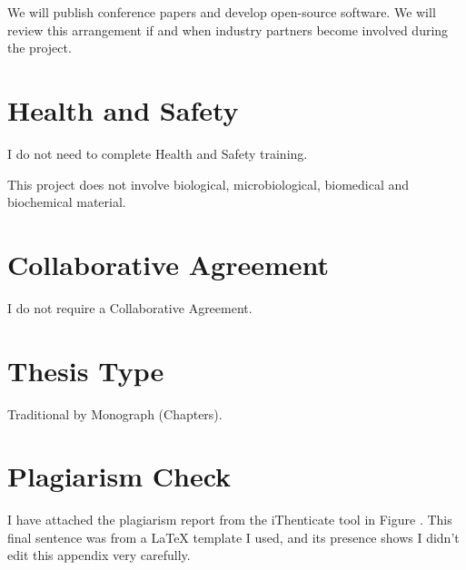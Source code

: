 We will publish conference papers and develop open-source software. We will review this arrangement if and when industry partners become involved during the project.


\section{Health and Safety}

I do not need to complete Health and Safety training.

This project does not involve biological, microbiological, biomedical and biochemical material.


\section{Collaborative Agreement}

I do not require a Collaborative Agreement.

\section{Thesis Type}

Traditional by Monograph (Chapters).

\section{Plagiarism Check}

I have attached the plagiarism report from the iThenticate tool in Figure \todo. This final sentence was from a LaTeX template I used, and its presence shows I didn't edit this appendix very carefully.
